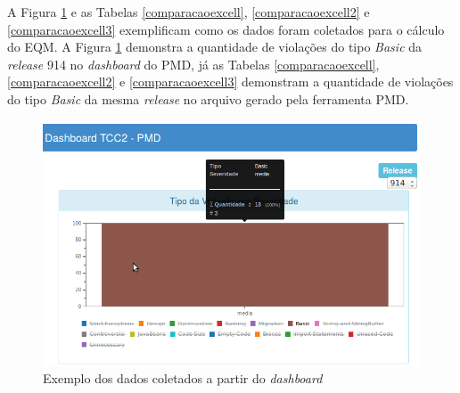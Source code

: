 \begin{table}
\begin{table}[H]

\end{table}
\FloatBarrier
\end{table}

\begin{table}
\begin{table}[H]

\end{table}
\FloatBarrier
\end{table}

\begin{table}
\begin{table}[H]

\end{table}
\FloatBarrier
\end{table}

\begin{table}
\begin{table}[H]

\end{table}
\FloatBarrier
\end{table}

\pagebreak

A Figura \ref{comparacaodash} e as Tabelas \ref{comparacaoexcell}, \ref{comparacaoexcell2} e \ref{comparacaoexcell3} exemplificam como os dados foram coletados para o cálculo do EQM. A Figura \ref{comparacaodash} demonstra a quantidade de violações do tipo \textit{Basic} da \textit{release} 914 no \textit{dashboard} do PMD, já as Tabelas \ref{comparacaoexcell}, \ref{comparacaoexcell2} e \ref{comparacaoexcell3} demonstram a quantidade de violações do tipo \textit{Basic} da mesma \textit{release} no arquivo gerado pela ferramenta PMD.


\begin{figure}[H]
\centering
\includegraphics[keepaspectratio=false,scale=0.7,angle=90]{figuras/figuras_nilton/comparacaodash1.png}
\caption{Exemplo dos dados coletados a partir do \textit{dashboard}}
\label{comparacaodash}
\end{figure}



